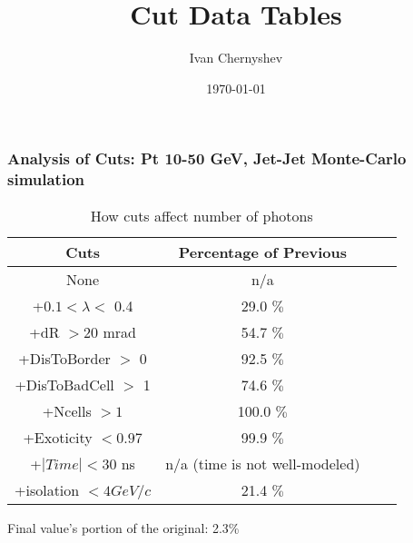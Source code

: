 \documentclass{beamer}
\title{Cut Data Tables}
\author{Ivan Chernyshev}
\date{\today}
\begin{document}
 

\frame 
{ 
\frametitle{Analysis of Cuts: Pt 10-50 GeV, Jet-Jet Monte-Carlo simulation} 
\begin{table} 
\caption{How cuts affect number of photons} 
\centering 
\begin{tabular}{c c c c} 
\hline\hline 
Cuts & Percentage of Previous\\ [0.5ex] 
\hline
None & n/a\\
+$0.1 < \lambda <$ 0.4 & 29.0 $\%$ \\
+dR $> 20$ mrad & 54.7 $\%$ \\
+DisToBorder $>$ 0 & 92.5 $\%$ \\
+DisToBadCell $>$ 1 & 74.6 $\%$ \\
+Ncells $> 1$ & 100.0 $\%$ \\
+Exoticity $< 0.97$ & 99.9 $\%$ \\
+$|Time| < 30$ ns & n/a (time is not well-modeled)  \\
+isolation $< 4 GeV/c$ & 21.4 $\%$ \\
[1ex] 
\hline 
\end{tabular} 
\label{table:nonlin} 
\end{table} 
 Final value's portion of the original: 2.3\%
 } 
\end{document}
